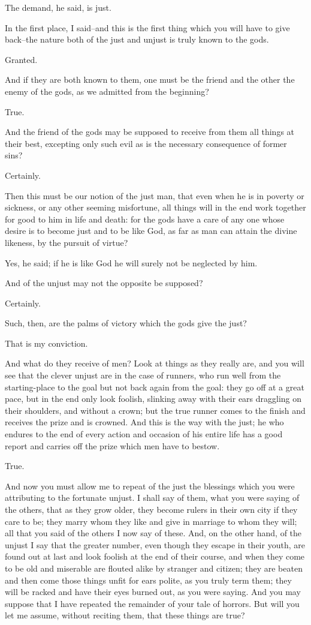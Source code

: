 The demand, he said, is just.

In the first place, I said--and this is the first thing which you will
have to give back--the nature both of the just and unjust is truly known
to the gods.

Granted.

And if they are both known to them, one must be the friend and the other
the enemy of the gods, as we admitted from the beginning?

True.

And the friend of the gods may be supposed to receive from them all
things at their best, excepting only such evil as is the necessary
consequence of former sins?

Certainly.

Then this must be our notion of the just man, that even when he is in
poverty or sickness, or any other seeming misfortune, all things will
in the end work together for good to him in life and death: for the gods
have a care of any one whose desire is to become just and to be like
God, as far as man can attain the divine likeness, by the pursuit of
virtue?

Yes, he said; if he is like God he will surely not be neglected by him.

And of the unjust may not the opposite be supposed?

Certainly.

Such, then, are the palms of victory which the gods give the just?

That is my conviction.

And what do they receive of men? Look at things as they really are, and
you will see that the clever unjust are in the case of runners, who run
well from the starting-place to the goal but not back again from the
goal: they go off at a great pace, but in the end only look foolish,
slinking away with their ears draggling on their shoulders, and without
a crown; but the true runner comes to the finish and receives the prize
and is crowned. And this is the way with the just; he who endures to the
end of every action and occasion of his entire life has a good report
and carries off the prize which men have to bestow.

True.

And now you must allow me to repeat of the just the blessings which you
were attributing to the fortunate unjust. I shall say of them, what you
were saying of the others, that as they grow older, they become rulers
in their own city if they care to be; they marry whom they like and give
in marriage to whom they will; all that you said of the others I now say
of these. And, on the other hand, of the unjust I say that the greater
number, even though they escape in their youth, are found out at last
and look foolish at the end of their course, and when they come to be
old and miserable are flouted alike by stranger and citizen; they are
beaten and then come those things unfit for ears polite, as you truly
term them; they will be racked and have their eyes burned out, as you
were saying. And you may suppose that I have repeated the remainder of
your tale of horrors. But will you let me assume, without reciting them,
that these things are true?

